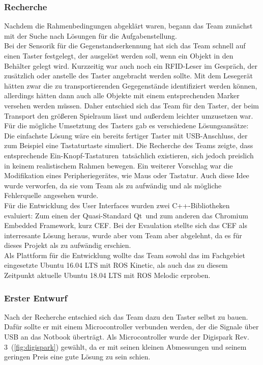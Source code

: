 \documentclass[a4paper,12pt,headsepline]{scrartcl}
\begin{document}
\subsubsection{Recherche}
Nachdem die Rahmenbedingungen abgeklärt waren, begann das Team zunächst mit der Suche nach Lösungen für die Aufgabenstellung.\\
Bei der Sensorik für die Gegenstandserkennung hat sich das Team schnell auf einen Taster festgelegt, der ausgelöst werden soll, wenn ein Objekt in den Behälter gelegt wird. Kurzzeitig war auch noch ein RFID-Leser im Gespräch, der zusätzlich oder anstelle des Taster angebracht werden sollte. Mit dem Lesegerät hätten zwar die zu transportierenden Gegegenstände identifiziert werden können, allerdings hätten dann auch alle Objekte mit einem entsprechenden Marker versehen werden müssen. Daher entschied sich das Team für den Taster, der beim Transport den größeren Spielraum lässt und außerdem leichter umzusetzen war. \\
Für die mögliche Umsetztung des Tasters gab es verschiedene Lösungsansätze: Die einfachste Lösung wäre ein bereits fertiger Taster mit USB-Anschluss, der zum Beispiel eine Tastaturtaste simuliert. Die Recherche des Teams zeigte, dass entsprechende \glqq Ein-Knopf-Tastaturen\grqq\ tatsächlich existieren, sich jedoch preislich in keinem realistischem Rahmen bewegen. Ein weiterer Vorschlag war die Modifikation eines Peripheriegerätes, wie Maus oder Tastatur. Auch diese Idee wurde verworfen, da sie vom Team als zu aufwändig und als mögliche Fehlerquelle angesehen wurde. \\
Für die Entwicklung des User Interfaces wurden zwei C++-Bibliotheken evaluiert: Zum einen der Quasi-Standard \glqq Qt\grqq\ und zum anderen das \glqq Chromium Embedded Framework\grqq , kurz CEF. Bei der Evaulation stellte sich das CEF als interresante Lösung heraus, wurde aber vom Team aber abgelehnt, da es für dieses Projekt als zu aufwändig erschien. \\
Als Plattform für die Entwicklung wollte das Team sowohl das im Fachgebiet eingesetzte Ubuntu 16.04 LTS mit ROS Kinetic, als auch das zu diesem Zeitpunkt aktuelle Ubuntu 18.04 LTS mit ROS Melodic erproben.

\subsubsection{Erster Entwurf}	
Nach der Recherche entschied sich das Team dazu den Taster selbst zu bauen. Dafür sollte er mit einem Microcontroller verbunden werden, der die Signale über USB an das Notbook überträgt. Als Microcontroller wurde der \glqq Digispark Rev. 3\grqq\ (\cref{fig:digispark}) gewählt, da er mit seinen kleinen Abmessungen und seinem geringen Preis eine gute Lösung zu sein schien. 
\end{document}
